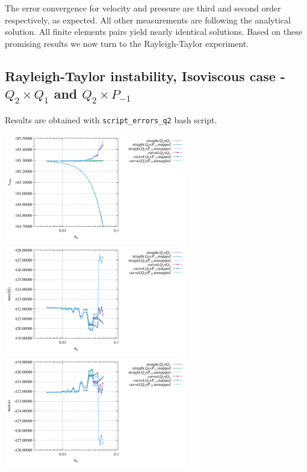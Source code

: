 The error convergence for velocity and pressure are third and second order 
respectively, as expected. All other measurements are following the analytical solution.
All finite elements pairs yield nearly identical solutions.
Based on these promising results we now turn to the Rayleigh-Taylor experiment.

\newpage
\subsection*{Rayleigh-Taylor instability, Isoviscous case - $Q_2\times Q_1$ and $Q_2\times P_{-1}$}

Results are obtained with {\tt script\_errors\_q2} bash script.

\begin{center}
\includegraphics[width=8cm]{python_codes/fieldstone_25/results/isoviscous/vrms.pdf}
\includegraphics[width=8cm]{python_codes/fieldstone_25/results/isoviscous/max_vel.pdf}\\
\includegraphics[width=8cm]{python_codes/fieldstone_25/results/isoviscous/min_u.pdf}

\end{center}
